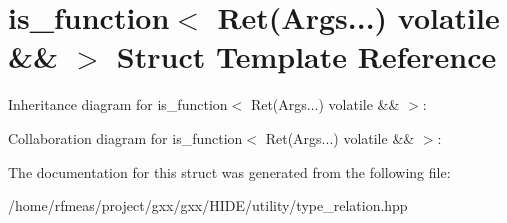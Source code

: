 \hypertarget{structis__function_3_01Ret_07Args_8_8_8_08_01volatile_01_6_6_01_4}{}\section{is\+\_\+function$<$ Ret(Args...) volatile \&\& $>$ Struct Template Reference}
\label{structis__function_3_01Ret_07Args_8_8_8_08_01volatile_01_6_6_01_4}


Inheritance diagram for is\+\_\+function$<$ Ret(Args...) volatile \&\& $>$\+:


Collaboration diagram for is\+\_\+function$<$ Ret(Args...) volatile \&\& $>$\+:


The documentation for this struct was generated from the following file\+:\begin{DoxyCompactItemize}
\item 
/home/rfmeas/project/gxx/gxx/\+H\+I\+D\+E/utility/type\+\_\+relation.\+hpp\end{DoxyCompactItemize}
